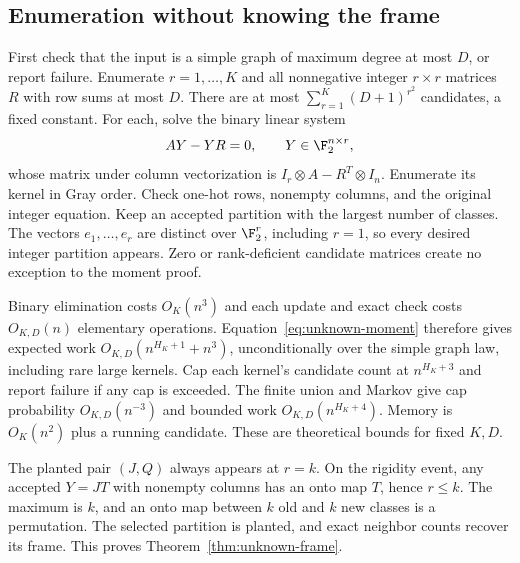 \subsection{Enumeration without knowing the frame}
First check that the input is a simple graph of maximum degree at most
$D$, or report failure. Enumerate $r=1,\ldots,K$ and all nonnegative integer $r\times r$
matrices $R$ with row sums at most $D$. There are at most
$\sum_{r=1}^K(D+1)^{r^2}$ candidates, a fixed constant.
For each, solve the binary linear system
\begin{equation}\label{eq:unknown-operator}
 AY-YR=0,\qquad Y\in\F_2^{n\times r},
\end{equation}
whose matrix under column vectorization is
$I_r\otimes A-R^T\otimes I_n$.
Enumerate its kernel in Gray order. Check one-hot rows, nonempty
columns, and the original integer equation. Keep an accepted
partition with the largest number of classes. The vectors
$e_1,\ldots,e_r$ are distinct over $\F_2^r$, including $r=1$, so
every desired integer partition appears. Zero or rank-deficient
candidate matrices create no exception to the moment proof.

Binary elimination costs $O_K(n^3)$ and each update and exact check
costs $O_{K,D}(n)$ elementary operations. Equation~\eqref{eq:unknown-moment}
therefore gives expected work $O_{K,D}(n^{H_K+1}+n^3)$, unconditionally
over the simple graph law, including rare large kernels.
Cap each kernel's candidate count at $n^{H_K+3}$ and report failure
if any cap is exceeded. The finite union and Markov give cap
probability $O_{K,D}(n^{-3})$ and bounded work
$O_{K,D}(n^{H_K+4})$. Memory is $O_K(n^2)$ plus a running candidate.
These are theoretical bounds for fixed $K,D$.

The planted pair $(J,Q)$ always appears at $r=k$.
On the rigidity event, any accepted $Y=JT$ with nonempty columns
has an onto map $T$, hence $r\le k$. The maximum is $k$, and an
onto map between $k$ old and $k$ new classes is a permutation.
The selected partition is planted, and exact neighbor counts recover
its frame. This proves Theorem~\ref{thm:unknown-frame}.

